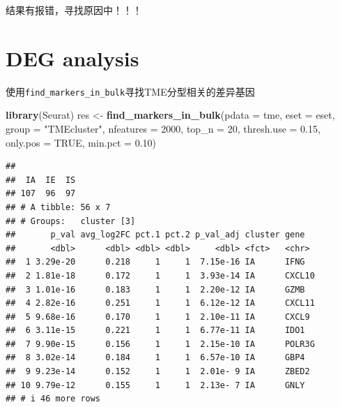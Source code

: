 \documentclass[
  12pt,
]{book}
\newenvironment{Shaded}{\begin{snugshade}}{\end{snugshade}}
\newcommand{\AttributeTok}[1]{\textcolor[rgb]{0.13,0.29,0.53}{#1}}
\newcommand{\ConstantTok}[1]{\textcolor[rgb]{0.56,0.35,0.01}{#1}}
\newcommand{\DecValTok}[1]{\textcolor[rgb]{0.00,0.00,0.81}{#1}}
\newcommand{\FloatTok}[1]{\textcolor[rgb]{0.00,0.00,0.81}{#1}}
\newcommand{\FunctionTok}[1]{\textcolor[rgb]{0.13,0.29,0.53}{\textbf{#1}}}
\newcommand{\NormalTok}[1]{#1}
\newcommand{\OtherTok}[1]{\textcolor[rgb]{0.56,0.35,0.01}{#1}}
\newcommand{\SpecialCharTok}[1]{\textcolor[rgb]{0.81,0.36,0.00}{\textbf{#1}}}
\newcommand{\StringTok}[1]{\textcolor[rgb]{0.31,0.60,0.02}{#1}}
\begin{document}
结果有报错，寻找原因中！！！

\hypertarget{deg-analysis-1}{%
\section{DEG analysis}\label{deg-analysis-1}}

使用\texttt{find\_markers\_in\_bulk}寻找TME分型相关的差异基因

\begin{Shaded}
\begin{Highlighting}[]
\FunctionTok{library}\NormalTok{(Seurat)}
\NormalTok{res }\OtherTok{\textless{}{-}} \FunctionTok{find\_markers\_in\_bulk}\NormalTok{(}\AttributeTok{pdata      =}\NormalTok{ tme, }
                            \AttributeTok{eset       =}\NormalTok{ eset, }
                            \AttributeTok{group      =} \StringTok{"TMEcluster"}\NormalTok{, }
                            \AttributeTok{nfeatures  =} \DecValTok{2000}\NormalTok{, }
                            \AttributeTok{top\_n      =} \DecValTok{20}\NormalTok{, }
                            \AttributeTok{thresh.use =} \FloatTok{0.15}\NormalTok{, }
                            \AttributeTok{only.pos   =} \ConstantTok{TRUE}\NormalTok{, }
                            \AttributeTok{min.pct    =} \FloatTok{0.10}\NormalTok{)}
\end{Highlighting}
\end{Shaded}

\begin{verbatim}
## 
##  IA  IE  IS 
## 107  96  97 
## # A tibble: 56 x 7
## # Groups:   cluster [3]
##       p_val avg_log2FC pct.1 pct.2 p_val_adj cluster gene  
##       <dbl>      <dbl> <dbl> <dbl>     <dbl> <fct>   <chr> 
##  1 3.29e-20      0.218     1     1  7.15e-16 IA      IFNG  
##  2 1.81e-18      0.172     1     1  3.93e-14 IA      CXCL10
##  3 1.01e-16      0.183     1     1  2.20e-12 IA      GZMB  
##  4 2.82e-16      0.251     1     1  6.12e-12 IA      CXCL11
##  5 9.68e-16      0.170     1     1  2.10e-11 IA      CXCL9 
##  6 3.11e-15      0.221     1     1  6.77e-11 IA      IDO1  
##  7 9.90e-15      0.156     1     1  2.15e-10 IA      POLR3G
##  8 3.02e-14      0.184     1     1  6.57e-10 IA      GBP4  
##  9 9.23e-14      0.152     1     1  2.01e- 9 IA      ZBED2 
## 10 9.79e-12      0.155     1     1  2.13e- 7 IA      GNLY  
## # i 46 more rows
\end{verbatim}

\begin{Shaded}
\end{Shaded}
\end{document}
